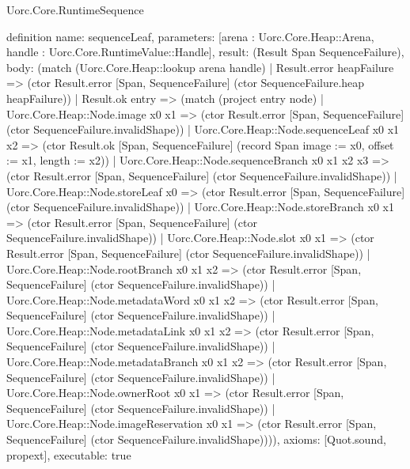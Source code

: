 \begin{lexlean}{Uorc.Core.RuntimeSequence}
\begin{semanticmodule}
definition{
  name: sequenceLeaf,
  parameters: [arena : Uorc.Core.Heap::Arena, handle : Uorc.Core.RuntimeValue::Handle],
  result: (Result Span SequenceFailure),
  body: (match (Uorc.Core.Heap::lookup arena handle)
    | Result.error heapFailure => (ctor Result.error [Span, SequenceFailure] (ctor SequenceFailure.heap heapFailure))
    | Result.ok entry => (match (project entry node)
      | Uorc.Core.Heap::Node.image x0 x1 => (ctor Result.error [Span, SequenceFailure] (ctor SequenceFailure.invalidShape))
      | Uorc.Core.Heap::Node.sequenceLeaf x0 x1 x2 => (ctor Result.ok [Span, SequenceFailure] (record Span {image := x0, offset := x1, length := x2}))
      | Uorc.Core.Heap::Node.sequenceBranch x0 x1 x2 x3 => (ctor Result.error [Span, SequenceFailure] (ctor SequenceFailure.invalidShape))
      | Uorc.Core.Heap::Node.storeLeaf x0 => (ctor Result.error [Span, SequenceFailure] (ctor SequenceFailure.invalidShape))
      | Uorc.Core.Heap::Node.storeBranch x0 x1 => (ctor Result.error [Span, SequenceFailure] (ctor SequenceFailure.invalidShape))
      | Uorc.Core.Heap::Node.slot x0 x1 => (ctor Result.error [Span, SequenceFailure] (ctor SequenceFailure.invalidShape))
      | Uorc.Core.Heap::Node.rootBranch x0 x1 x2 => (ctor Result.error [Span, SequenceFailure] (ctor SequenceFailure.invalidShape))
      | Uorc.Core.Heap::Node.metadataWord x0 x1 x2 => (ctor Result.error [Span, SequenceFailure] (ctor SequenceFailure.invalidShape))
      | Uorc.Core.Heap::Node.metadataLink x0 x1 x2 => (ctor Result.error [Span, SequenceFailure] (ctor SequenceFailure.invalidShape))
      | Uorc.Core.Heap::Node.metadataBranch x0 x1 x2 => (ctor Result.error [Span, SequenceFailure] (ctor SequenceFailure.invalidShape))
      | Uorc.Core.Heap::Node.ownerRoot x0 x1 => (ctor Result.error [Span, SequenceFailure] (ctor SequenceFailure.invalidShape))
      | Uorc.Core.Heap::Node.imageReservation x0 x1 => (ctor Result.error [Span, SequenceFailure] (ctor SequenceFailure.invalidShape)))),
  axioms: [Quot.sound, propext],
  executable: true
}


\end{semanticmodule}
\end{lexlean}

